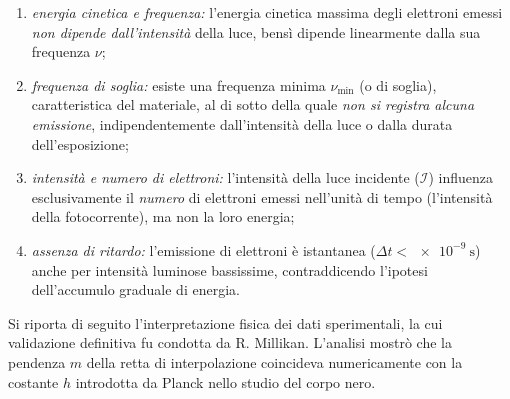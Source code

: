 \documentclass[a4paper,11pt]{report}
\begin{document}
\begin{enumerate}
    \item \textit{energia cinetica e frequenza:} l'energia cinetica massima degli elettroni emessi \textit{non dipende dall'intensità} della luce, bensì dipende linearmente dalla sua frequenza $\nu$;
    
    \item \textit{frequenza di soglia:} esiste una frequenza minima $\nu_{\text{min}}$ (o di soglia), caratteristica del materiale, al di sotto della quale \textit{non si registra alcuna emissione}, indipendentemente dall'intensità della luce o dalla durata dell'esposizione;
    
    \item \textit{intensità e numero di elettroni:} l'intensità della luce incidente ($\mathcal{I}$) influenza esclusivamente il \textit{numero} di elettroni emessi nell'unità di tempo (l'intensità della fotocorrente), ma non la loro energia;
    
    \item \textit{assenza di ritardo:} l'emissione di elettroni è istantanea ($\Delta t < \SI{e-9}{\second}$) anche per intensità luminose bassissime, contraddicendo l'ipotesi dell'accumulo graduale di energia.
\end{enumerate}
Si riporta di seguito l'interpretazione fisica dei dati sperimentali, la cui validazione definitiva fu condotta da R. Millikan.
L'analisi mostrò che la pendenza $m$ della retta di interpolazione coincideva numericamente con la costante $h$ introdotta da Planck nello studio del corpo nero. \\
\end{document}

